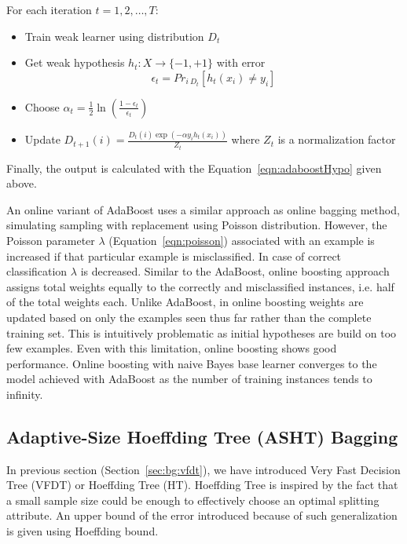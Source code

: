 \documentclass[a4paper, 11pt, oneside]{book}
\begin{document}
For each iteration $t= 1, 2, \dots, T$:
\begin{itemize}
    \item Train weak learner using distribution $D_t$
    \item Get weak hypothesis $h_t : X \rightarrow \{-1, +1\}$ with error
    \[
        \epsilon_t = Pr_{i ~ D_t} [h_t(x_i) \ne y_i]
    \]
    \item Choose $\alpha_t = \frac{1}{2} \ln \left( \frac{1 - \epsilon_t}{\epsilon_t} \right)$
    \item Update $D_{t+1} (i) = \frac{D_t(i) \exp(-\alpha y_i h_t(x_i))}{Z_t}$ where $Z_t$ is a normalization factor
\end{itemize}
Finally, the output is calculated with the Equation~\ref{eqn:adaboostHypo} given above.

An online variant of AdaBoost uses a similar approach as online bagging method, simulating sampling with replacement using Poisson distribution. However, the Poisson parameter $\lambda$ (Equation~\ref{eqn:poisson}) associated with an example is increased if that particular example is misclassified. In case of correct classification $\lambda$ is decreased. Similar to the AdaBoost, online boosting approach assigns total weights equally to the correctly and misclassified instances, i.e. half of the total weights each. Unlike AdaBoost, in online boosting weights are updated based on only the examples seen thus far rather than the complete training set. This is intuitively problematic as initial hypotheses are build on too few examples. Even with this limitation, online boosting shows good performance. Online boosting with naive Bayes base learner converges to the model achieved with AdaBoost as the number of training instances tends to infinity.

\subsection{Adaptive-Size Hoeffding Tree (ASHT) Bagging}
In previous section (Section~\ref{sec:bg:vfdt}), we have introduced Very Fast Decision Tree (VFDT) or Hoeffding Tree (HT). Hoeffding Tree is inspired by the fact that a small sample size could be enough to effectively choose an optimal splitting attribute. An upper bound of the error introduced because of such generalization is given using Hoeffding bound.
\end{document}
